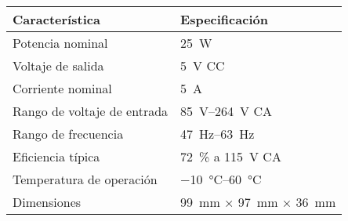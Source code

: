 	\begin{tabular}{ll}
		\toprule
		\textbf{Característica} & \textbf{Especificación} \\
		\midrule
		Potencia nominal & \SI{25}{\watt} \\
		Voltaje de salida & \SI{5}{\volt} CC \\
		Corriente nominal & \SI{5}{\ampere} \\
		Rango de voltaje de entrada & \SIrange{85}{264}{\volt} CA \\
		Rango de frecuencia & \SIrange{47}{63}{\hertz} \\
		Eficiencia típica & \SI{72}{\percent} a \SI{115}{\volt} CA \\
		Temperatura de operación & \SIrange{-10}{60}{\celsius} \\
		Dimensiones & \SI{99}{\milli\meter} × \SI{97}{\milli\meter} × \SI{36}{\milli\meter} \\
		\bottomrule
	\end{tabular}